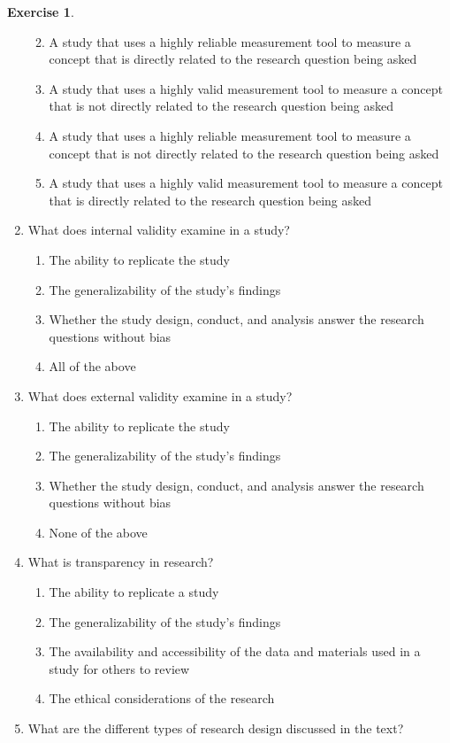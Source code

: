 \documentclass[
  12pt,
  oneside]{book}
\providecommand{\tightlist}{%
  \setlength{\itemsep}{0pt}\setlength{\parskip}{0pt}}
\theoremstyle{definition}
\theoremstyle{definition}
\theoremstyle{definition}
\newtheorem{exercise}{Exercise}[chapter]
\theoremstyle{definition}
\theoremstyle{remark}
\begin{document}
\begin{exercise}
\begin{enumerate}
  \begin{enumerate}
  \def\labelenumii{\alph{enumii})}
  \tightlist
  \item
    A study that uses a highly reliable measurement tool to measure a concept that is directly related to the research question being asked
  \item
    A study that uses a highly valid measurement tool to measure a concept that is not directly related to the research question being asked
  \item
    A study that uses a highly reliable measurement tool to measure a concept that is not directly related to the research question being asked
  \item
    A study that uses a highly valid measurement tool to measure a concept that is directly related to the research question being asked
  \end{enumerate}
\item
  What does internal validity examine in a study?

  \begin{enumerate}
  \def\labelenumii{\alph{enumii})}
  \tightlist
  \item
    The ability to replicate the study
  \item
    The generalizability of the study's findings
  \item
    Whether the study design, conduct, and analysis answer the research questions without bias
  \item
    All of the above
  \end{enumerate}
\item
  What does external validity examine in a study?

  \begin{enumerate}
  \def\labelenumii{\alph{enumii})}
  \tightlist
  \item
    The ability to replicate the study
  \item
    The generalizability of the study's findings
  \item
    Whether the study design, conduct, and analysis answer the research questions without bias
  \item
    None of the above
  \end{enumerate}
\item
  What is transparency in research?

  \begin{enumerate}
  \def\labelenumii{\alph{enumii})}
  \tightlist
  \item
    The ability to replicate a study
  \item
    The generalizability of the study's findings
  \item
    The availability and accessibility of the data and materials used in a study for others to review
  \item
    The ethical considerations of the research
  \end{enumerate}
\item
  What are the different types of research design discussed in the text?


\end{enumerate}
\end{exercise}
\end{document}
